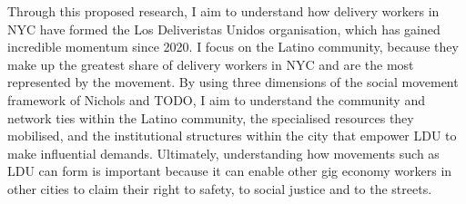 \documentclass{article}
\begin{document}
Through this proposed research, I aim to understand how delivery workers in NYC have formed the Los Deliveristas Unidos organisation, which has gained incredible momentum since 2020. I focus on the Latino community, because they make up the greatest share of delivery workers in NYC and are the most represented by the movement. By using three dimensions of the social movement framework of Nichols and TODO, I aim to understand the community and network ties within the Latino community, the specialised resources they mobilised, and the institutional structures within the city that empower LDU to make influential demands.
Ultimately, understanding how movements such as LDU can form is important because it can enable other gig economy workers in other cities to claim their right to safety, to social justice and to the streets. 

\printbibliography
\end{document}
